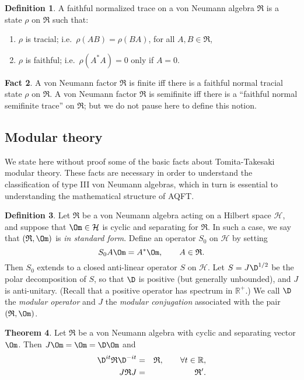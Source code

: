 \documentclass[11pt]{article}
\newcommand{\alg}[1]{\mathfrak{#1}}
\theoremstyle{definition}
\newtheorem{thm}{Theorem}[section]
\newtheorem{fact}[thm]{Fact}
\theoremstyle{definition}
\newtheorem{defn}[thm]{Definition}
\theoremstyle{remark}
\def\2#1{{\mathcal #1}}
\def\7#1{{\mathbb #1}}
\def\al#1{{\mathfrak #1}}
\begin{document}
\begin{defn} A faithful normalized trace on a von Neumann algebra $\alg{R}$ is a
  state $\rho$ on $\alg{R}$ such that:
\begin{enumerate}
\item $\rho$ is tracial; i.e.\ $\rho (AB)=\rho (BA)$, for all $A,B\in \alg{R}$,
\item $\rho$ is faithful; i.e.\ $\rho (A^*A)=0$ only if $A=0$.
\end{enumerate}
\end{defn}

\begin{fact} A von Neumann factor $\alg{R}$ is finite iff there is a
  faithful normal tracial state $\rho$ on $\alg{R}$.  A von Neumann
  factor $\alg{R}$ is semifinite iff there is a ``faithful normal
  semifinite trace'' on $\alg{R}$; but we do not pause here to define
  this notion.  \end{fact}

\subsection{Modular theory} \label{tt}

We state here without proof some of the basic facts about
Tomita-Takesaki modular theory.  These facts are necessary in order to
understand the classification of type III von Neumann algebras, which
in turn is essential to understanding the mathematical structure of
AQFT.  

\begin{defn} Let $\al R$ be a von Neumann algebra acting on a Hilbert
  space $\2H$, and suppose that $\Om \in \2H$ is cyclic and separating
  for $\al R$.  In such a case, we say that $(\al R,\Om )$ is \emph{in
    standard form}.  Define an operator $S_0$ on $\2H$ by setting
  \[ S_0A\Om = A^*\Om ,\qquad A\in \al R .\] Then $S_0$
  extends to a closed anti-linear operator $S$ on
  $\2H$.  Let $S=J\D ^{1/2}$ be the polar decomposition
  of $S$, so that $\D$ is positive (but generally
  unbounded), and $J$ is anti-unitary.  (Recall that a
  positive operator has spectrum in $\7R^+$.)  We call
  $\D$ the \emph{modular operator} and $J$ the
  \emph{modular conjugation} associated with the pair
  $(\al R,\Om )$.  \end{defn}

\begin{thm} Let $\al R$ be a von Neumann algebra with
  cyclic and separating vector $\Om$.  Then $J\Om =\Om
  =\D \Om$ and
  \begin{eqnarray*} \D ^{it}\al R\D ^{-it} &=&
    \al R ,\qquad \forall t\in \7R ,\\
    J\al R J&=&\al R' .\end{eqnarray*} \end{thm}
\end{document}
